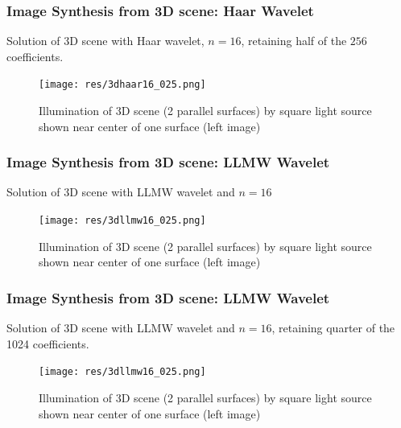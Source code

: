 \begin{frame}\frametitle{Image Synthesis from 3D scene: Haar Wavelet}
Solution of 3D scene with Haar wavelet, $n=16$, retaining half of the $256$ coefficients. 

\vspace{-2 mm}
 \begin{figure}
              \centering
              \texttt{[image: res/3dhaar16\_025.png]}
              \vspace{-2 mm}
              \caption{Illumination of 3D scene (2 parallel surfaces) by square light source shown near center of one surface (left image)}
              \label{fig_e_vs_n_f1}
              \end{figure}
\end{frame}

\begin{frame}\frametitle{Image Synthesis from 3D scene: LLMW Wavelet}
Solution of 3D scene with LLMW wavelet and $n=16$

\vspace{-2 mm}
 \begin{figure}
              \centering
              \texttt{[image: res/3dllmw16\_025.png]}
              \vspace{-2 mm}
              \caption{Illumination of 3D scene (2 parallel surfaces) by square light source shown near center of one surface (left image)}
              \label{fig_e_vs_n_f1}
              \end{figure}
\end{frame}

\begin{frame}\frametitle{Image Synthesis from 3D scene: LLMW Wavelet}
Solution of 3D scene with LLMW wavelet and $n=16$, retaining quarter of the 1024 coefficients.

\vspace{-2 mm}
 \begin{figure}
              \centering
              \texttt{[image: res/3dllmw16\_025.png]}
              \vspace{-2 mm}
              \caption{Illumination of 3D scene (2 parallel surfaces) by square light source shown near center of one surface (left image)}
              \label{fig_e_vs_n_f1}
              \end{figure}
\end{frame}


